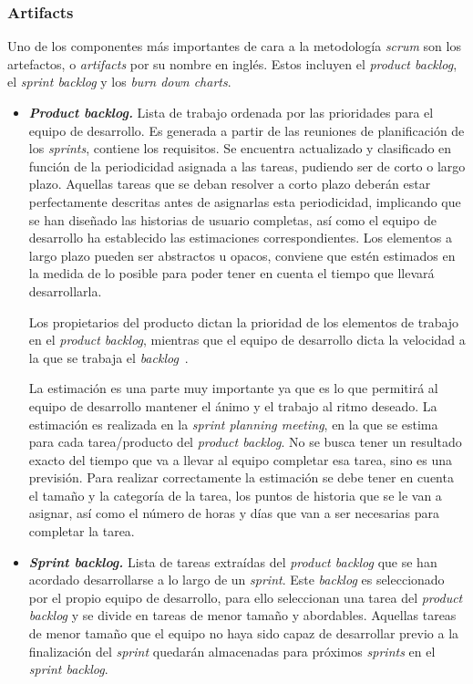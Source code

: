 \subsubsection{Artifacts}
Uno de los componentes más importantes de cara a la metodología \textit{scrum} son los artefactos, o \textit{artifacts} por su nombre en inglés. Estos incluyen el \textit{product backlog}, el \textit{sprint backlog} y los \textit{burn down charts}.
\begin{itemize}
\item \textbf{\textit{Product backlog.}} Lista de trabajo ordenada por las prioridades para el equipo de desarrollo. Es generada a partir de las reuniones de planificación de los \textit{sprints}, contiene los requisitos. Se encuentra actualizado y clasificado en función de la periodicidad asignada a las tareas, pudiendo ser de corto o largo plazo. Aquellas tareas que se deban resolver a corto plazo deberán estar perfectamente descritas antes de asignarlas esta periodicidad, implicando que se han diseñado las historias de usuario completas, así como el equipo de desarrollo ha establecido las estimaciones correspondientes. Los elementos a largo plazo pueden ser abstractos u opacos, conviene que estén estimados en la medida de lo posible para poder tener en cuenta el tiempo que llevará desarrollarla.

Los propietarios del producto dictan la prioridad de los elementos de trabajo en el \textit{product backlog}, mientras que el equipo de desarrollo dicta la velocidad a la que se trabaja el \textit{backlog}~\cite{danradigan2021}.

La estimación es una parte muy importante ya que es lo que permitirá al equipo de desarrollo mantener el ánimo y el trabajo al ritmo deseado. La estimación es realizada en la \textit{sprint planning meeting}, en la que se estima para cada tarea/producto del \textit{product backlog}. No se busca tener un resultado exacto del tiempo que va a llevar al equipo completar esa tarea, sino es una previsión. Para realizar correctamente la estimación se debe tener en cuenta el tamaño y la categoría de la tarea, los puntos de historia que se le van a asignar, así como el número de horas y días que van a ser necesarias para completar la tarea. 

\item \textbf{\textit{Sprint backlog.}} Lista de tareas extraídas del \textit{product backlog} que se han acordado desarrollarse a lo largo de un \textit{sprint}. Este \textit{backlog} es seleccionado por el propio equipo de desarrollo, para ello seleccionan una tarea del \textit{product backlog} y se divide en tareas de menor tamaño y abordables. Aquellas tareas de menor tamaño que el equipo no haya sido capaz de desarrollar previo a la finalización del \textit{sprint} quedarán almacenadas para próximos \textit{sprints} en el \textit{sprint backlog}.
\end{itemize}

